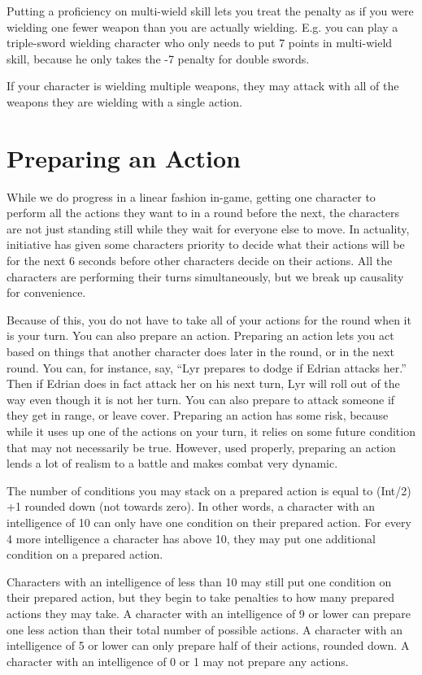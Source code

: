 Putting a proficiency on multi-wield skill lets you treat the penalty as if you were wielding one fewer weapon than you are actually wielding. E.g. you can play a triple-sword wielding character who only needs to put 7 points in multi-wield skill, because he only takes the -7 penalty for double swords.

If your character is wielding multiple weapons, they may attack with all of the weapons they are wielding with a single action.

\section{Preparing an Action}
While we do progress in a linear fashion in-game, getting one character to perform all the actions they want to in a round before the next, the characters are not just standing still while they wait for everyone else to move. In actuality, initiative has given some characters priority to decide what their actions will be for the next 6 seconds before other characters decide on their actions. All the characters are performing their turns simultaneously, but we break up causality for convenience.

Because of this, you do not have to take all of your actions for the round when it is your turn. You can also prepare an action. Preparing an action lets you act based on things that another character does later in the round, or in the next round. You can, for instance, say, “Lyr prepares to dodge if Edrian attacks her.” Then if Edrian does in fact attack her on his next turn, Lyr will roll out of the way even though it is not her turn. You can also prepare to attack someone if they get in range, or leave cover. Preparing an action has some risk, because while it uses up one of the actions on your turn, it relies on some future condition that may not necessarily be true. However, used properly, preparing an action lends a lot of realism to a battle and makes combat very dynamic.

The number of conditions you may stack on a prepared action is equal to (Int/2) +1 rounded down (not towards zero). In other words, a character with an intelligence of 10 can only have one condition on their prepared action. For every 4 more intelligence a character has above 10, they may put one additional condition on a prepared action.

Characters with an intelligence of less than 10 may still put one condition on their prepared action, but they begin to take penalties to how many prepared actions they may take. A character with an intelligence of 9 or lower can prepare one less action than their total number of possible actions. A character with an intelligence of 5 or lower can only prepare half of their actions, rounded down. A character with an intelligence of 0 or 1 may not prepare any actions.

